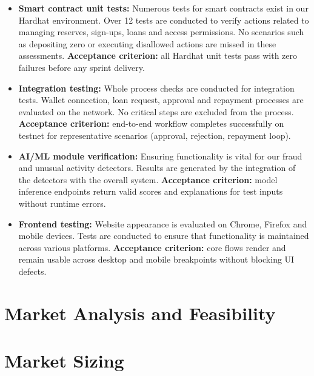 \documentclass[acmsmall,screen,review]{acmart}
\begin{document}
\begin{itemize}[noitemsep]
\item \textbf{Smart contract unit tests:} Numerous tests for smart contracts exist in our Hardhat environment. Over 12 tests are conducted to verify actions related to managing reserves, sign-ups, loans and access permissions. No scenarios such as depositing zero or executing disallowed actions are missed in these assessments. \textbf{Acceptance criterion:} all Hardhat unit tests pass with zero failures before any sprint delivery.
\item \textbf{Integration testing:} Whole process checks are conducted for integration tests. Wallet connection, loan request, approval and repayment processes are evaluated on the network. No critical steps are excluded from the process. \textbf{Acceptance criterion:} end-to-end workflow completes successfully on testnet for representative scenarios (approval, rejection, repayment loop).
\item \textbf{AI/ML module verification:} Ensuring functionality is vital for our fraud and unusual activity detectors. Results are generated by the integration of the detectors with the overall system. \textbf{Acceptance criterion:} model inference endpoints return valid scores and explanations for test inputs without runtime errors.
\item \textbf{Frontend testing:} Website appearance is evaluated on Chrome, Firefox and mobile devices. Tests are conducted to ensure that functionality is maintained across various platforms. \textbf{Acceptance criterion:} core flows render and remain usable across desktop and mobile breakpoints without blocking UI defects.
\end{itemize}


\section{Market Analysis and Feasibility}

\section{Market Sizing}
\end{document}
